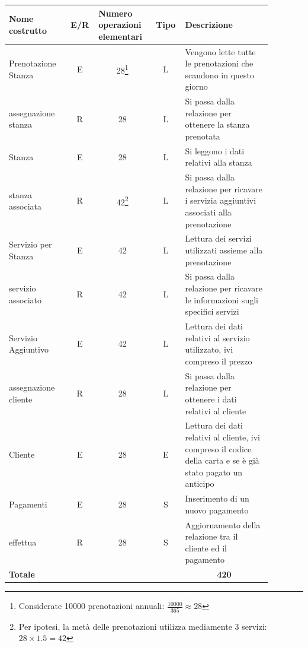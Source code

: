 \documentclass[12pt,a4paper]{article}
\begin{document}
\begin{center}\setlength{\extrarowheight}{1.5pt}\begin{longtable}{|p{0.2\linewidth}|p{0.1\linewidth}|p{0.175\linewidth}|p{0.1\linewidth}|p{0.3\linewidth}|}\hline \textbf{Nome costrutto}   & \multicolumn{1}{|c|}{\textbf{E/R}} & \textbf{Numero operazioni elementari} & \multicolumn{1}{|c|}{\textbf{Tipo}} & \textbf{Descrizione}\\ 
\hline
Prenotazione Stanza
 & 
\multicolumn{1}{|c|}{E}
 & 
\multicolumn{1}{|c|}{28\footnote{Considerate 10000 prenotazioni annuali: $\frac{10000}{365}\approx 28$}}
 & 
\multicolumn{1}{|c|}{L}
 & 
Vengono lette tutte le prenotazioni che scandono in questo giorno
\\
\hline
assegnazione stanza
 & 
\multicolumn{1}{|c|}{R}
 & 
\multicolumn{1}{|c|}{28}
 & 
\multicolumn{1}{|c|}{L}
 & 
Si passa dalla relazione per ottenere la stanza prenotata
\\
\hline
Stanza
 & 
\multicolumn{1}{|c|}{E}
 & 
\multicolumn{1}{|c|}{28}
 & 
\multicolumn{1}{|c|}{L}
 & 
Si leggono i dati relativi alla stanza
\\
\hline
stanza associata
 & 
\multicolumn{1}{|c|}{R}
 & 
\multicolumn{1}{|c|}{42\footnote{Per ipotesi, la metà delle prenotazioni utilizza mediamente 3 servizi: $28\times 1.5=42$}}
 & 
\multicolumn{1}{|c|}{L}
 & 
Si passa dalla relazione per ricavare i servizia aggiuntivi associati alla prenotazione
\\
\hline
Servizio per Stanza
 & 
\multicolumn{1}{|c|}{E}
 & 
\multicolumn{1}{|c|}{42}
 & 
\multicolumn{1}{|c|}{L}
 & 
Lettura dei servizi utilizzati assieme alla prenotazione
\\
\hline
servizio associato
 & 
\multicolumn{1}{|c|}{R}
 & 
\multicolumn{1}{|c|}{42}
 & 
\multicolumn{1}{|c|}{L}
 & 
Si passa dalla relazione per ricavare le informazioni sugli specifici servizi
\\
\hline
Servizio Aggiuntivo
 & 
\multicolumn{1}{|c|}{E}
 & 
\multicolumn{1}{|c|}{42}
 & 
\multicolumn{1}{|c|}{L}
 & 
Lettura dei dati relativi al servizio utilizzato, ivi compreso il prezzo
\\
\hline
assegnazione cliente
 & 
\multicolumn{1}{|c|}{R}
 & 
\multicolumn{1}{|c|}{28}
 & 
\multicolumn{1}{|c|}{L}
 & 
Si passa dalla relazione per ottenere i dati relativi al cliente
\\
\hline
Cliente
 & 
\multicolumn{1}{|c|}{E}
 & 
\multicolumn{1}{|c|}{28}
 & 
\multicolumn{1}{|c|}{E}
 & 
Lettura dei dati relativi al cliente, ivi compreso il codice della carta e se è già stato pagato un anticipo
\\
\hline
Pagamenti
 & 
\multicolumn{1}{|c|}{E}
 & 
\multicolumn{1}{|c|}{28}
 & 
\multicolumn{1}{|c|}{S}
 & 
Inserimento di un nuovo pagamento
\\
\hline
effettua
 & 
\multicolumn{1}{|c|}{R}
 & 
\multicolumn{1}{|c|}{28}
 & 
\multicolumn{1}{|c|}{S}
 & 
Aggiornamento della relazione tra il cliente ed il pagamento
\\
\hline
\multicolumn{4}{|l|}{\textbf{Totale}}
 & 
\multicolumn{1}{|c|}{\textbf{420}}
\\
\hline
\end{longtable}\end{center}
\end{document}
